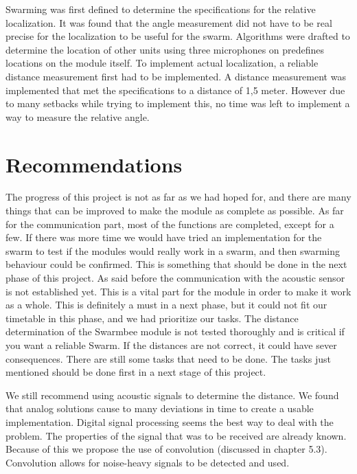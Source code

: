 \documentclass[10pt,a4paper]{article}
\begin{document}
Swarming was first defined to determine the specifications for the relative localization. It was found that the angle measurement did not have to be real precise for the localization to be useful for the swarm. Algorithms were drafted to determine the location of other units using three microphones on predefines locations on the module itself. To implement actual localization, a reliable distance measurement first had to be implemented. A distance measurement was implemented that met the specifications to a distance of 1,5 meter. However due to many setbacks while trying to implement this,  no time was left to implement a way to measure the relative angle.


\section{Recommendations}
The progress of this project is not as far as we had hoped for, and there are many things that can be improved to make the module as complete as possible. As far for the communication part, most of the functions are completed, except for a few. If there was more time we would have tried an implementation for the swarm to test if the modules would really work in a swarm, and then swarming behaviour could be confirmed. This is something that should be done in the next phase of this project. As said before the communication with the acoustic sensor is not established yet. This is a vital part for the module in order to make it work as a whole. This is definitely a must in a next phase, but it could not fit our timetable in this phase, and we had prioritize our tasks. The distance determination of the Swarmbee module is not tested thoroughly and is critical if you want a reliable Swarm. If the distances are not correct, it could have sever consequences. There are still some tasks that need to be done. The tasks just mentioned should be done first in a next stage of this project.

We still recommend using acoustic signals to determine the distance. We found that analog solutions cause to many deviations in time to create a usable implementation. Digital signal processing seems the best way to deal with the problem. The properties of the signal that was to be received are already known. Because of this we propose the use of convolution (discussed in chapter 5.3). Convolution allows for noise-heavy signals to be detected and used. 
\end{document}
